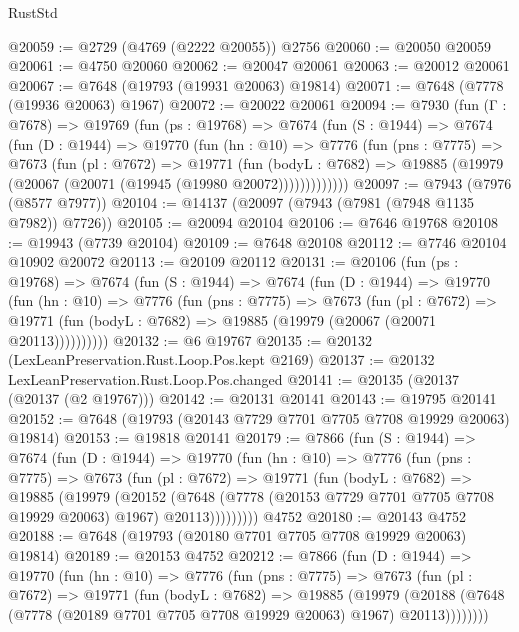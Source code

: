 \begin{lexlean}{RustStd}
\begin{coremodule}
@20059 := @2729 (@4769 (@2222 @20055)) @2756
@20060 := @20050 @20059
@20061 := @4750 @20060
@20062 := @20047 @20061
@20063 := @20012 @20061
@20067 := @7648 (@19793 (@19931 @20063) @19814)
@20071 := @7648 (@7778 (@19936 @20063) @1967)
@20072 := @20022 @20061
@20094 := @7930
    (fun (Γ : @7678) =>
    @19769
      (fun (ps : @19768) =>
      @7674
        (fun (S : @1944) =>
        @7674
          (fun (D : @1944) =>
          @19770
            (fun (hn : @10) =>
            @7776
              (fun (pns : @7775) =>
              @7673
                (fun (pl : @7672) =>
                @19771
                  (fun (bodyL : @7682) =>
                  @19885 (@19979 (@20067 (@20071 (@19945 (@19980 @20072)))))))))))))
@20097 := @7943 (@7976 (@8577 @7977))
@20104 := @14137 (@20097 (@7943 (@7981 (@7948 @1135 @7982)) @7726))
@20105 := @20094 @20104
@20106 := @7646 @19768
@20108 := @19943 (@7739 @20104)
@20109 := @7648 @20108
@20112 := @7746 @20104 @10902 @20072
@20113 := @20109 @20112
@20131 := @20106
    (fun (ps : @19768) =>
    @7674
      (fun (S : @1944) =>
      @7674
        (fun (D : @1944) =>
        @19770
          (fun (hn : @10) =>
          @7776
            (fun (pns : @7775) =>
            @7673
              (fun (pl : @7672) =>
              @19771 (fun (bodyL : @7682) => @19885 (@19979 (@20067 (@20071 @20113))))))))))
@20132 := @6 @19767
@20135 := @20132 (LexLeanPreservation.Rust.Loop.Pos.kept @2169)
@20137 := @20132 LexLeanPreservation.Rust.Loop.Pos.changed
@20141 := @20135 (@20137 (@20137 (@2 @19767)))
@20142 := @20131 @20141
@20143 := @19795 @20141
@20152 := @7648 (@19793 (@20143 @7729 @7701 @7705 @7708 @19929 @20063) @19814)
@20153 := @19818 @20141
@20179 := @7866
    (fun (S : @1944) =>
    @7674
      (fun (D : @1944) =>
      @19770
        (fun (hn : @10) =>
        @7776
          (fun (pns : @7775) =>
          @7673
            (fun (pl : @7672) =>
            @19771
              (fun (bodyL : @7682) =>
              @19885
                (@19979
                  (@20152
                    (@7648
                      (@7778 (@20153 @7729 @7701 @7705 @7708 @19929 @20063) @1967)
                      @20113)))))))))
    @4752
@20180 := @20143 @4752
@20188 := @7648 (@19793 (@20180 @7701 @7705 @7708 @19929 @20063) @19814)
@20189 := @20153 @4752
@20212 := @7866
    (fun (D : @1944) =>
    @19770
      (fun (hn : @10) =>
      @7776
        (fun (pns : @7775) =>
        @7673
          (fun (pl : @7672) =>
          @19771
            (fun (bodyL : @7682) =>
            @19885
              (@19979
                (@20188 (@7648 (@7778 (@20189 @7701 @7705 @7708 @19929 @20063) @1967) @20113))))))))

\end{coremodule}
\end{lexlean}
